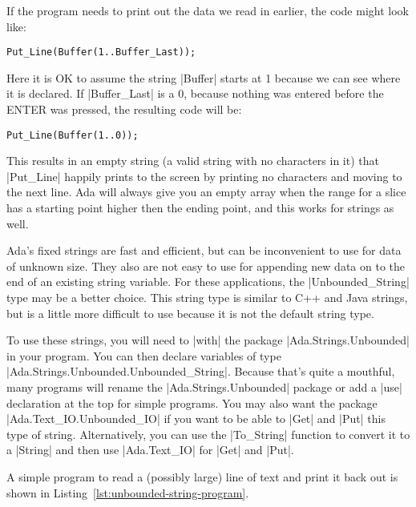 If the program needs to print out the data we read in earlier, the code might look like:

\begin{lstlisting}
Put_Line(Buffer(1..Buffer_Last));
\end{lstlisting}

\noindent Here it is OK to assume the string |Buffer| starts at 1 because we can see where it is
declared. If |Buffer_Last| is a 0, because nothing was entered before the ENTER was pressed, the
resulting code will be:

\begin{lstlisting}
Put_Line(Buffer(1..0));
\end{lstlisting}

\noindent This results in an empty string (a valid string with no characters in it) that
|Put_Line| happily prints to the screen by printing no characters and moving to the next
line. Ada will always give you an empty array when the range for a slice has a starting point
higher then the ending point, and this works for strings as well.

Ada's fixed strings are fast and efficient, but can be inconvenient to use for data of unknown
size. They also are not easy to use for appending new data on to the end of an existing string
variable.  For these applications, the |Unbounded_String| type may be a better choice. This
string type is similar to C++ and Java strings, but is a little more difficult to use because it
is not the default string type.

To use these strings, you will need to |with| the package |Ada.Strings.Unbounded| in your
program. You can then declare variables of type |Ada.Strings.Unbounded.Unbounded_String|.
Because that's quite a mouthful, many programs will rename the |Ada.Strings.Unbounded| package
or add a |use| declaration at the top for simple programs. You may also want the package
|Ada.Text_IO.Unbounded_IO| if you want to be able to |Get| and |Put| this type of string.
Alternatively, you can use the |To_String| function to convert it to a |String| and then use
|Ada.Text_IO| for |Get| and |Put|.

A simple program to read a (possibly large) line of text and print it back out is shown in
Listing~\ref{lst:unbounded-string-program}.

